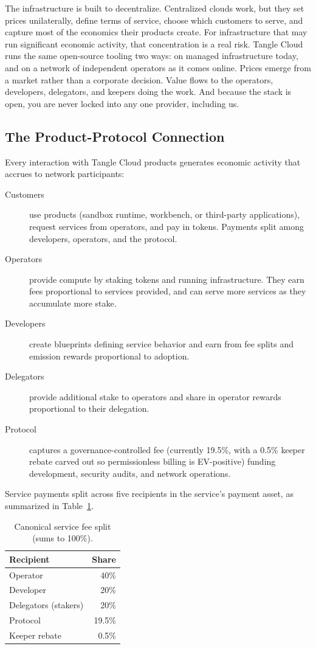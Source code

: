 \documentclass[11pt,a4paper]{article}
\begin{document}
The infrastructure is built to decentralize. Centralized clouds work, but they set prices unilaterally, define terms of service, choose which customers to serve, and capture most of the economics their products create. For infrastructure that may run significant economic activity, that concentration is a real risk. Tangle Cloud runs the same open-source tooling two ways: on managed infrastructure today, and on a network of independent operators as it comes online. Prices emerge from a market rather than a corporate decision. Value flows to the operators, developers, delegators, and keepers doing the work. And because the stack is open, you are never locked into any one provider, including us.

\subsection{The Product-Protocol Connection}

Every interaction with Tangle Cloud products generates economic activity that accrues to network participants:

\begin{description}
    \item[Customers] use products (sandbox runtime, workbench, or third-party applications), request services from operators, and pay in tokens. Payments split among developers, operators, and the protocol.
    \item[Operators] provide compute by staking tokens and running infrastructure. They earn fees proportional to services provided, and can serve more services as they accumulate more stake.
    \item[Developers] create blueprints defining service behavior and earn from fee splits and emission rewards proportional to adoption.
    \item[Delegators] provide additional stake to operators and share in operator rewards proportional to their delegation.
    \item[Protocol] captures a governance-controlled fee (currently 19.5\%, with a 0.5\% keeper rebate carved out so permissionless billing is EV-positive) funding development, security audits, and network operations.
\end{description}

Service payments split across five recipients in the service's payment asset, as summarized in Table~\ref{tab:feesplit}.

\begin{table}[h]
\centering
\caption{Canonical service fee split (sums to 100\%).}
\label{tab:feesplit}
\begin{tabular}{lr}
\toprule
\textbf{Recipient} & \textbf{Share} \\
\midrule
Operator & 40\% \\
Developer & 20\% \\
Delegators (stakers) & 20\% \\
Protocol & 19.5\% \\
Keeper rebate & 0.5\% \\
\bottomrule
\end{tabular}
\end{table}
\end{document}
